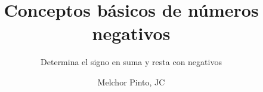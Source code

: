 \documentclass{guia}
\title{Conceptos básicos de números negativos}
\subtitle{Determina el signo en suma y resta con negativos}
\author{Melchor Pinto, JC}
\begin{document}
%
\begin{questions}
\questionboxed{}
\end{questions}
\end{document}
